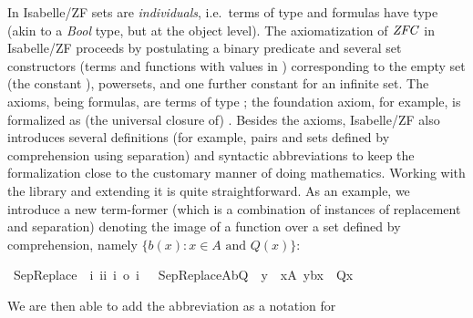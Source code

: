 In Isabelle/ZF sets are \emph{individuals}, i.e.\ terms of type
 and formulas have type  (akin to a \emph{Bool}
type, but at the object level).  The axiomatization of $\mathit{ZFC}$ in
Isabelle/ZF proceeds by postulating a binary predicate
\isatt{\ensuremath{\in}} and several set constructors (terms and
functions with values in ) corresponding to the empty set (the
constant ), powersets, and one further constant
 for an infinite set. The axioms, being formulas, are terms
of type ; the foundation axiom, for example, is formalized as
(the universal closure of) . %
Besides the axioms, Isabelle/ZF also introduces several definitions
(for example, pairs and sets defined by comprehension using
separation) and syntactic abbreviations to keep the formalization
close to the customary manner of doing mathematics.  Working with the
library and extending it is quite straightforward.  As an example, we
introduce a new term-former (which is a combination of instances of
replacement and separation) denoting the image of a function over a
set defined by comprehension, namely
$\{b(x): x\in A\text{ and }Q(x)\}$:
\begin{isabelle}
  \isamarkupfalse%
  \ SepReplace\ {\isacharcolon}{\isacharcolon}\
  {\isachardoublequoteopen}{\isacharbrackleft}i{\isacharcomma}\
  i{\isasymRightarrow}i{\isacharcomma}\ i{\isasymRightarrow}\
  o{\isacharbrackright}\
  {\isasymRightarrow}i{\isachardoublequoteclose}\
  \isanewline \ \
  {\isachardoublequoteopen}SepReplace{\isacharparenleft}A{\isacharcomma}b{\isacharcomma}Q{\isacharparenright}\
  {\isacharequal}{\isacharequal}\ {\isacharbraceleft}y\ {\isachardot}\
  x{\isasymin}A{\isacharcomma}\
  y{\isacharequal}b{\isacharparenleft}x{\isacharparenright}\
  {\isasymand}\
  Q{\isacharparenleft}x{\isacharparenright}{\isacharbraceright}{\isachardoublequoteclose}
\end{isabelle}
\noindent %
We are then able to add the abbreviation  as a notation for
